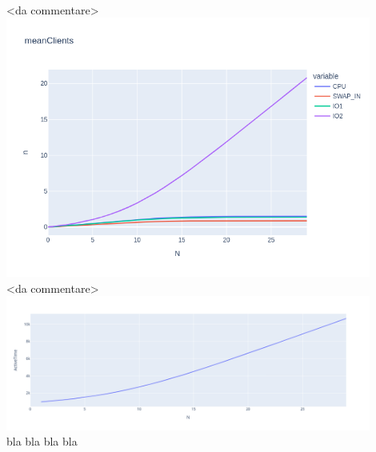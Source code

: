 \documentclass[12pt,a4paper]{article}
\begin{document}
    \\
    <da commentare>
    \\
    \includegraphics[width=0.9\textwidth]{Images/meanClients.png}
    \\
    <da commentare>
    \\
    \includegraphics[width=0.9\textwidth]{Images/ActiveTimes.png}
    \\
    bla bla bla bla
    
\end{document}
